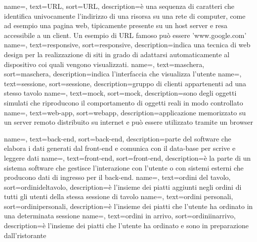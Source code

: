 {
    name=,
    text=URL,
    sort=URL,
    description={è una sequenza di caratteri che identifica univocamente l'indirizzo di una risorsa su una rete di computer, come ad esempio una pagina web, tipicamente presente su un host server e resa accessibile a un client. Un esempio di URL famoso può essere 'www.google.com'}
}
{
    name=,
    text=responsive,
    sort=responsive,
    description={indica una tecnica di web design per la realizzazione di siti in grado di adattarsi automaticamente al dispositivo coi quali vengono visualizzati.}
}
{
    name=,
    text=maschera,
    sort=maschera,
    description={indica l'interfaccia che visualizza l'utente}
}
{
    name=,
    text=sessione,
    sort=sessione,
    description={gruppo di clienti appartenenti ad una stesso tavolo}
}
{
    name=,
    text=mock,
    sort=mock,
    description={sono degli oggetti simulati che riproducono il comportamento di oggetti reali in modo controllato}
}
{
    name=,
    text=web-app,
    sort=webapp,
    description={applicazione memorizzato su un server remoto distribuito su internet e può essere utilizzato tramite un browser}
}

{
    name=,
    text=back-end,
    sort=back-end,
    description={parte del software che elabora i dati generati dal front-end e comunica con il data-base per scrive e leggere dati}
}
{
    name=,
    text=front-end,
    sort=front-end,
    description={è la parte di un sistema software che gestisce l'interazione con l'utente o con sistemi esterni che producono dati di ingresso per il back-end.}
}
{
    name=,
    text=ordini del tavolo,
    sort=ordinideltavolo,
    description={è l'insieme dei piatti aggiunti negli ordini di tutti gli utenti della stessa sessione di tavolo}
}
{
    name=,
    text=ordini personali,
    sort=ordinipersonali,
    description={è l'insieme dei piatti che l'utente ha ordinato in una determinata sessione}
}
{
    name=,
    text=ordini in arrivo,
    sort=ordiniinarrivo,
    description={è l'insieme dei piatti che l'utente ha ordinato e sono in preparazione dall'ristorante}
}

